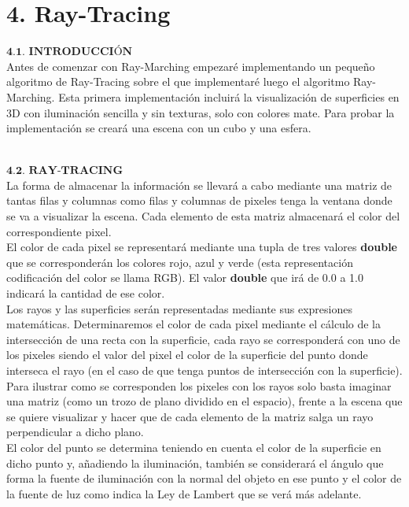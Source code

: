 \chapter*{4. Ray-Tracing}

$\textbf{4.1. INTRODUCCIÓN}$
${ }$\\

Antes de comenzar con Ray-Marching empezaré implementando un pequeño algoritmo de Ray-Tracing sobre el que implementaré luego el algoritmo Ray-Marching. Esta primera implementación incluirá la visualización de superficies en 3D con iluminación sencilla y sin texturas, solo con colores mate. Para probar la implementación se creará una escena con un cubo y una esfera.

${ }$\\
$\textbf{4.2. RAY-TRACING}$
${ }$\\

La forma de almacenar la información se llevará a cabo mediante una matriz de tantas filas y columnas como filas y columnas de pixeles tenga la ventana donde se va a visualizar la escena. Cada elemento de esta matriz almacenará el color del correspondiente pixel.
	${ }$\\	
	
El color de cada pixel se representará mediante una tupla de tres valores \textbf{double} que se corresponderán los colores rojo, azul y verde (esta representación codificación del color se llama RGB). El valor \textbf{double} que irá de 0.0 a 1.0 indicará la cantidad de ese color.
	${ }$\\	
	
Los rayos y las superficies serán representadas mediante sus expresiones matemáticas. Determinaremos el color de cada pixel mediante el cálculo de la intersección de una recta con la superficie, cada rayo se corresponderá con uno de los pixeles siendo el valor del pixel el color de la superficie del punto donde interseca el rayo (en el caso de que tenga puntos de intersección con la superficie). Para ilustrar como se corresponden los pixeles con los rayos solo basta imaginar una matriz (como un trozo de plano dividido en el espacio), frente a la escena que se quiere visualizar y hacer que de cada elemento de la matriz salga un rayo perpendicular a dicho plano.
	${ }$\\	
	
El color del punto se determina teniendo en cuenta el color de la superficie en dicho punto y, añadiendo la iluminación, también se considerará el ángulo que forma la fuente de iluminación con la normal del objeto en ese punto y el color de la fuente de luz como indica la Ley de Lambert que se verá más adelante.
	${ }$\\	

